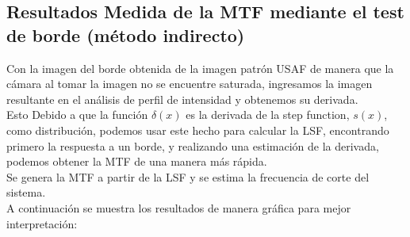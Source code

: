 \documentclass{./packages/optica-article}
\begin{document}
\subsection{Resultados Medida de la MTF mediante el test de borde (método indirecto)}\label{sec:resultados:indirecto}
Con la imagen del borde obtenida de la imagen patrón USAF de manera que la cámara al tomar la imagen no se encuentre saturada, ingresamos la imagen resultante en el análisis de perfil de intensidad y obtenemos su derivada.\\
Esto Debido a que la función $\delta(x)$ es la derivada de la step function, $s(x)$, como distribución, podemos usar este hecho para calcular la LSF, encontrando primero la respuesta a un borde, y realizando una estimación de la derivada, podemos obtener la MTF de una manera más rápida.\\
Se genera la MTF a partir de la LSF y se estima la frecuencia de corte del sistema.\\
A continuación se muestra los resultados de manera gráfica para mejor interpretación:
\end{document}
